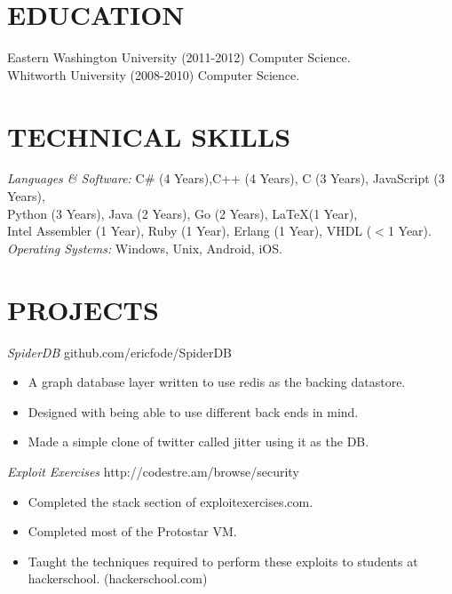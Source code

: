 \documentclass[line]{res}
\begin{document}

\address{509-699-1184 $|$ ericfode@gmail.com}

 
\begin{resume}
 
\section{EDUCATION}	Eastern Washington University (2011-2012) Computer Science.\\
					Whitworth University (2008-2010) Computer Science.
					
 
 
\section{TECHNICAL SKILLS} {\sl Languages \& Software:} C\# (4 Years),C++ (4 Years), C (3 Years), JavaScript (3 Years),\\ Python (3 Years), Java (2 Years), Go (2 Years), \LaTeX (1 Year),\\ Intel Assembler (1 Year), Ruby (1 Year), Erlang (1 Year), VHDL ($<$1 Year).\\
{\sl Operating Systems:} Windows, Unix, Android, iOS.

                
\section{PROJECTS} 
				{\sl SpiderDB} \hfill github.com/ericfode/SpiderDB
                 \begin{itemize}  \itemsep -2pt %
                 	\item A graph database layer written to use redis as the backing datastore.
                 	\item Designed with being able to use different back ends in mind.
                 	\item Made a simple clone of twitter called jitter using it as the DB.				 
				 \end{itemize}
				{\sl Exploit Exercises} \hfill http://codestre.am/browse/security
                 \begin{itemize}  \itemsep -2pt %
                	\item Completed the stack section of exploitexercises.com.
                	\item Completed most of the Protostar VM.
                	\item Taught the techniques required to perform these exploits to students at hackerschool. (hackerschool.com)
                \end{itemize}

\end{resume}
\end{document}
